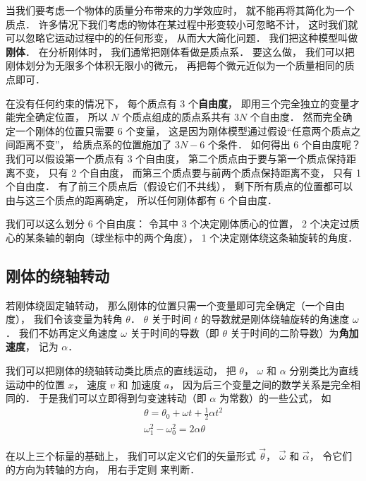 

当我们要考虑一个物体的质量分布带来的力学效应时， 就不能再将其简化为一个质点． 许多情况下我们考虑的物体在某过程中形变较小可忽略不计， 这时我们就可以忽略它运动过程中的的任何形变， 从而大大简化问题． 我们把这种模型叫做\textbf{刚体}． 在分析刚体时， 我们通常把刚体看做是质点系． 要这么做， 我们可以把刚体划分为无限多个体积无限小的微元， 再把每个微元近似为一个质量相同的质点即可． 

在没有任何约束的情况下， 每个质点有 3 个\textbf{自由度}， 即用三个完全独立的变量才能完全确定位置， 所以 $N$ 个质点组成的质点系共有 $3N$ 个自由度． 然而完全确定一个刚体的位置只需要 6 个变量， 这是因为刚体模型通过假设“任意两个质点之间距离不变”， 给质点系的位置施加了 $3N - 6$ 个条件． 如何得出 6 个自由度呢？ 我们可以假设第一个质点有 3 个自由度， 第二个质点由于要与第一个质点保持距离不变， 只有 2 个自由度， 而第三个质点要与前两个质点保持距离不变， 只有 1 个自由度． 有了前三个质点后（假设它们不共线）， 剩下所有质点的位置都可以由与这三个质点的距离确定， 所以任何刚体都有 6 个自由度．

我们可以这么划分 6 个自由度： 令其中 3 个决定刚体质心的位置， 2 个决定过质心的某条轴的朝向（球坐标中的两个角度）， 1 个决定刚体绕这条轴旋转的角度．

\subsection{刚体的绕轴转动}

若刚体绕固定轴转动， 那么刚体的位置只需一个变量即可完全确定（一个自由度）， 我们令该变量为转角 $\theta$． $\theta$ 关于时间 $t$ 的导数就是刚体绕轴旋转的角速度 $\omega$． 我们不妨再定义角速度 $\omega$ 关于时间的导数（即 $\theta$ 关于时间的二阶导数）为\textbf{角加速度}， 记为 $\alpha$．

我们可以把刚体的绕轴转动类比质点的直线运动， 把 $\theta$， $\omega$ 和 $\alpha$ 分别类比为直线运动中的位置 $x$， 速度 $v$ 和 加速度 $a$， 因为后三个变量之间的数学关系是完全相同的． 于是我们可以立即得到匀变速转动（即 $\alpha$ 为常数）的一些公式， 如
\begin{gather}
\theta = \theta_0 + \omega t + \frac 12 \alpha t^2\\
\omega_1^2 - \omega_0^2 = 2\alpha \theta
\end{gather}

在以上三个标量的基础上， 我们可以定义它们的矢量形式 $\vec \theta$， $\vec \omega$ 和 $\vec \alpha$， 令它们的方向为转轴的方向， 用右手定则 来判断．

